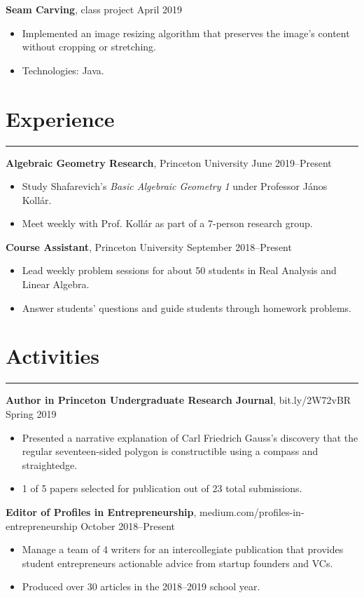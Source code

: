 \documentclass[11pt]{article}
\newcommand{\resumesection}[1]{\vspace{-0.2cm}\section*{#1}\vspace{-0.2cm}\hrule\vspace{0.2cm}}
\begin{document}
\textbf{Seam Carving}, class project \hfill April 2019
\begin{itemize}
	\item Implemented an image resizing algorithm that preserves the image's content without cropping or stretching.
	\item Technologies: Java.
\end{itemize}

\resumesection{Experience}

\textbf{Algebraic Geometry Research}, Princeton University \hfill June 2019--Present
\begin{itemize}
	\item Study Shafarevich's \textit{Basic Algebraic Geometry 1} under Professor J\'{a}nos Koll\'{a}r.
	\item Meet weekly with Prof. Koll\'{a}r as part of a 7-person research group.
\end{itemize}

\textbf{Course Assistant}, Princeton University \hfill September 2018--Present
\begin{itemize}
	\item Lead weekly problem sessions for about 50 students in Real Analysis and Linear Algebra.
	\item Answer students' questions and guide students through homework problems.
\end{itemize}

\resumesection{Activities}

\textbf{Author in Princeton Undergraduate Research Journal}, bit.ly/2W72vBR \hfill Spring 2019
\begin{itemize}
	\item Presented a narrative explanation of Carl Friedrich Gauss's discovery that the regular seventeen-sided polygon is constructible using a compass and straightedge.
	\item 1 of 5 papers selected for publication out of 23 total submissions.
\end{itemize}

\textbf{Editor of Profiles in Entrepreneurship}, medium.com/profiles-in-entrepreneurship \hfill October 2018--Present
\begin{itemize}
	\item Manage a team of 4 writers for an intercollegiate publication that provides student entrepreneurs actionable advice from startup founders and VCs.
	\item Produced over 30 articles in the 2018--2019 school year.
\end{itemize}
\end{document}
